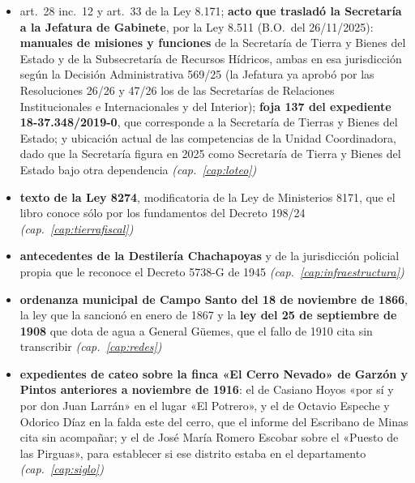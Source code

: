 \begin{itemize}[leftmargin=*]
alcanzado a La Caldera entre 1980 y 2018, de la que la lectura de 1980 halló, además del decreto 12, el 133, que extiende la emergencia a todo ese año, cuyo expediente, el C/19-02591/80, se pide también ---su considerando da más de dos mil hectáreas afectadas, sin desagregarlas por departamento---, y la de 1984, el 1156, por las inundaciones de ese verano, que no nombra localidades y cuyo expediente, el C/19-03716/84, se pide con él, y la de 1987, el 623, que declara en emergencia a Chicoana y La Caldera por granizo, lluvias torrenciales y vientos, cuyo expediente, el C/24-03870/87, se pide también, y las de 2005, 2008 y 2009, el 212, por sequía, y el 2247 y el 1197, para los tabacaleros de diez departamentos, cuyos expedientes, el 090-0017.418/07 y el 31.566/09, se piden con ellos (212, Nº 17080, h.\ 5 y 6; 2247, Nº 17882, h.\ 10 y 11; 1197, Nº 18070, h.\ 8 y 9) \textit{(cap.\ \ref{cap:tierra})}
\item art.\ 28 inc.\ 12 y art.\ 33 de la Ley 8.171; \textbf{acto que trasladó la Secretaría a la Jefatura de Gabinete}, por la Ley 8.511 (B.O.\ del 26/11/2025): \textbf{manuales de misiones y funciones} de la Secretaría de Tierra y Bienes del Estado y de la Subsecretaría de Recursos Hídricos, ambas en esa jurisdicción según la Decisión Administrativa 569/25 (la Jefatura ya aprobó por las Resoluciones 26/26 y 47/26 los de las Secretarías de Relaciones Institucionales e Internacionales y del Interior); \textbf{foja 137 del expediente 18-37.348/2019-0}, que corresponde a la Secretaría de Tierras y Bienes del Estado; y ubicación actual de las competencias de la Unidad Coordinadora, dado que la Secretaría figura en 2025 como Secretaría de Tierra y Bienes del Estado bajo otra dependencia \textit{(cap.\ \ref{cap:loteo})}
\item \textbf{texto de la Ley 8274}, modificatoria de la Ley de Ministerios 8171, que el libro conoce sólo por los fundamentos del Decreto 198/24 \textit{(cap.\ \ref{cap:tierrafiscal})}
\item \textbf{antecedentes de la Destilería Chachapoyas} y de la jurisdicción policial propia que le reconoce el Decreto 5738-G de 1945 \textit{(cap.\ \ref{cap:infraestructura})}
\item \textbf{ordenanza municipal de Campo Santo del 18 de noviembre de 1866}, la ley que la sancionó en enero de 1867 y la \textbf{ley del 25 de septiembre de 1908} que dota de agua a General Güemes, que el fallo de 1910 cita sin transcribir \textit{(cap.\ \ref{cap:redes})}
\item \textbf{expedientes de cateo sobre la finca «El Cerro Nevado» de Garzón y Pintos anteriores a noviembre de 1916}: el de Casiano Hoyos «por sí y por don Juan Larrán» en el lugar «El Potrero», y el de Octavio Espeche y Odorico Díaz en la falda este del cerro, que el informe del Escribano de Minas cita sin acompañar; y el de José María Romero Escobar sobre el «Puesto de las Pirguas», para establecer si ese distrito estaba en el departamento \textit{(cap.\ \ref{cap:siglo})}

\end{itemize}
